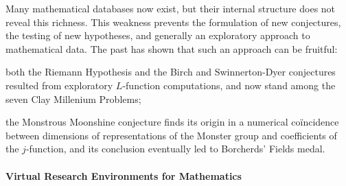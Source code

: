 Many mathematical databases now exist, but their internal structure does not reveal this
richness. This weakness prevents the formulation of new conjectures, the testing of new
hypotheses, and generally an exploratory approach to mathematical data. The past has shown
that such an approach can be fruitful:
\begin{compactitem}
\item both the Riemann Hypothesis and the Birch and Swinnerton-Dyer conjectures resulted
  from exploratory $L$-function computations, and now stand among the seven Clay Millenium
  Problems;
\item the Monstrous Moonshine conjecture finds its origin in a numerical co\"incidence
  between dimensions of representations of the Monster group and coefficients of the
  $j$-function, and its conclusion eventually led to Borcherds' Fields medal.
\end{compactitem}



\paragraph{Virtual Research Environments for Mathematics}\ 

